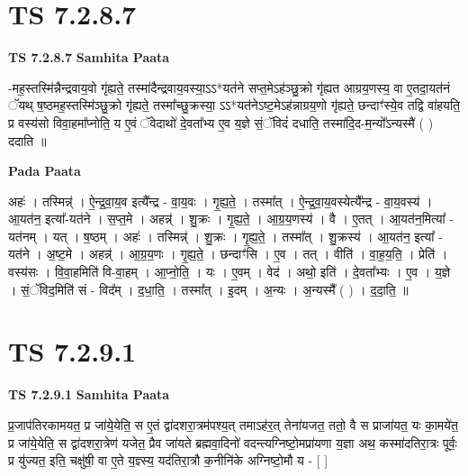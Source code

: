 \documentclass[17pt]{extarticle}
\begin{document}

\section{ TS 7.2.8.7 }

\textbf{TS 7.2.8.7 } \newline
\textbf{Samhita Paata} \newline

-मह॒स्तस्मि॑न्नैन्द्रवाय॒वो गृ॑ह्यते॒ तस्मा॑दैन्द्रवाय॒वस्या॒ऽऽ*यत॑ने सप्त॒मेऽह॑ञ्छु॒क्रो गृ॑ह्यत आग्रय॒णस्य॒ वा ए॒तदा॒यत॑नं ॅयथ् ष॒ष्ठमह॒स्तस्मि॑ञ्छु॒क्रो गृ॑ह्यते॒ तस्मा᳚च्छु॒क्रस्या॒ ऽऽ*यत॑नेऽष्ट॒मेऽह॑न्नाग्रय॒णो गृ॑ह्यते॒ छन्दाꣳ॑स्ये॒व तद्वि वा॑हयति॒ प्र वस्य॑सो विवा॒हमा᳚प्नोति॒ य ए॒वं ॅवेदाथो॑ दे॒वता᳚भ्य ए॒व य॒ज्ञे सं॒ॅविदं॑ दधाति॒ तस्मा॑दि॒द-म॒न्यो᳚ऽन्यस्मै॑ ( ) ददाति ॥ \newline

\textbf{Pada Paata} \newline

अहः॑ । तस्मिन्न्॑ । ऐ॒न्द्र॒वा॒य॒व इत्यै᳚न्द्र - वा॒य॒वः । गृ॒ह्य॒ते॒ । तस्मा᳚त् । ऐ॒न्द्र॒वा॒य॒वस्येत्यै᳚न्द्र - वा॒य॒वस्य॑ । आ॒यत॑न॒ इत्या᳚-यत॑ने । स॒प्त॒मे । अहन्न्॑ । शु॒क्रः । गृ॒ह्य॒ते॒ । आ॒ग्र॒य॒णस्य॑ । वै । ए॒तत् । आ॒यत॑न॒मित्या᳚ - यत॑नम् । यत् । ष॒ष्ठम् । अहः॑ । तस्मिन्न्॑ । शु॒क्रः । गृ॒ह्य॒ते॒ । तस्मा᳚त् । शु॒क्रस्य॑ । आ॒यत॑न॒ इत्या᳚ - यत॑ने । अ॒ष्ट॒मे । अहन्न्॑ । आ॒ग्र॒य॒णः । गृ॒ह्य॒ते॒ । छन्दाꣳ॑सि । ए॒व । तत् । वीति॑ । वा॒ह॒य॒ति॒ । प्रेति॑ । वस्य॑सः । वि॒वा॒हमिति॑ वि-वा॒हम् । आ॒प्नो॒ति॒ । यः । ए॒वम् । वेद॑ । अथो॒ इति॑ । दे॒वता᳚भ्यः । ए॒व । य॒ज्ञे । सं॒ॅविद॒मिति॑ सं - विद᳚म् । द॒धा॒ति॒ । तस्मा᳚त् । इ॒दम् । अ॒न्यः । अ॒न्यस्मै᳚ ( ) । द॒दा॒ति॒ ॥  \newline





\section{ TS 7.2.9.1 }

\textbf{TS 7.2.9.1 } \newline
\textbf{Samhita Paata} \newline

प्र॒जाप॑तिरकामयत॒ प्र जा॑ये॒येति॒ स ए॒तं द्वा॑दशरा॒त्रम॑पश्य॒त् तमाऽह॑र॒त् तेना॑यजत॒ ततो॒ वै स प्राजा॑यत॒ यः का॒मये॑त॒ प्र जा॑ये॒येति॒ स द्वा॑दशरा॒त्रेण॑ यजेत॒ प्रैव जा॑यते ब्रह्मवा॒दिनो॑ वदन्त्यग्निष्टो॒मप्रा॑यणा य॒ज्ञा अथ॒ कस्मा॑दतिरा॒त्रः पूर्वः॒ प्र यु॑ज्यत॒ इति॒ चक्षु॑षी॒ वा ए॒ते य॒ज्ञ्स्य॒ यद॑तिरा॒त्रौ क॒नीनि॑के अग्निष्टो॒मौ य - [  ] \newline
\end{document}
